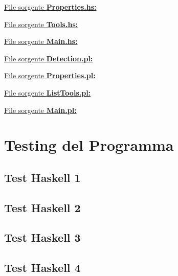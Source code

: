 \documentclass{article}
\begin{document}
\underline{File sorgente \textbf{Properties.hs:}}


\underline{File sorgente \textbf{Tools.hs:}}


\lstset{inputencoding=utf8/latin1}
\underline{File sorgente \textbf{Main.hs:}}


\newpage
\raggedright
\underline{File sorgente \textbf{Detection.pl:}}


\underline{File sorgente \textbf{Properties.pl:}}


\underline{File sorgente \textbf{ListTools.pl:}}


\lstset{inputencoding=utf8/latin1}
\underline{File sorgente \textbf{Main.pl:}}

\newpage

\section{Testing del Programma}
\subsection*{Test Haskell 1}

\lstset{inputencoding=utf8/latin1}


\subsection*{Test Haskell 2}

\lstset{inputencoding=utf8/latin1}


\subsection*{Test Haskell 3}

\lstset{inputencoding=utf8/latin1}


\subsection*{Test Haskell 4}
\end{document}
